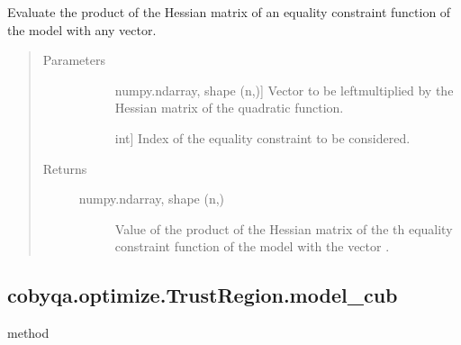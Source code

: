\documentclass[letterpaper,10pt,english]{sphinxmanual}
\begin{document}
\begin{fulllineitems}
\begin{fulllineitems}
\label{\detokenize{refs/generated/cobyqa.optimize.TrustRegion.model_ceq_hessp:cobyqa.optimize.TrustRegion.model_ceq_hessp}}
\sphinxAtStartPar
Evaluate the product of the Hessian matrix of an equality constraint
function of the model with any vector.
\begin{quote}\begin{description}
\item[{Parameters}] \leavevmode\begin{description}
\item[{}] \leavevmode{[}numpy.ndarray, shape (n,){]}
\sphinxAtStartPar
Vector to be left\sphinxhyphen{}multiplied by the Hessian matrix of the quadratic
function.

\item[{}] \leavevmode{[}int{]}
\sphinxAtStartPar
Index of the equality constraint to be considered.

\end{description}

\item[{Returns}] \leavevmode\begin{description}
\item[{numpy.ndarray, shape (n,)}] \leavevmode
\sphinxAtStartPar
Value of the product of the Hessian matrix of the \sphinxhyphen{}th equality
constraint function of the model with the vector .

\end{description}

\end{description}\end{quote}

\end{fulllineitems}



\subsection{cobyqa.optimize.TrustRegion.model\_cub}
\label{\detokenize{refs/generated/cobyqa.optimize.TrustRegion.model_cub:cobyqa-optimize-trustregion-model-cub}}\label{\detokenize{refs/generated/cobyqa.optimize.TrustRegion.model_cub::doc}}
\sphinxAtStartPar
method


\end{fulllineitems}
\end{document}
